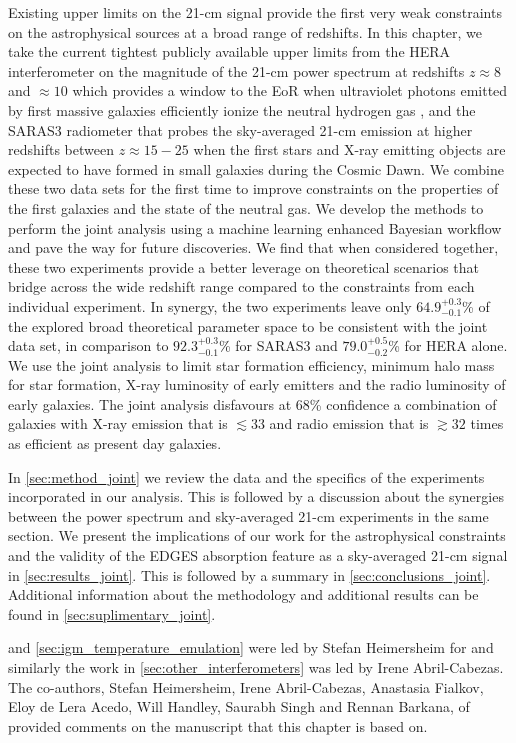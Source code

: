 Existing upper limits on the 21-cm signal provide the first very weak constraints on the astrophysical sources at a broad range of redshifts. 
In this chapter, we take the current tightest publicly available upper limits from the HERA interferometer on the magnitude of the 21-cm power spectrum at redshifts $z \approx 8$ and $\approx 10$  which provides a window to the EoR when ultraviolet photons emitted by first massive galaxies efficiently ionize the neutral hydrogen gas \cite{HERA_2022b}, and the SARAS3 radiometer \cite{SARAS3} that  probes the sky-averaged 21-cm emission at higher redshifts between $z\approx 15 - 25$ when the first stars and X-ray emitting objects are expected to have formed in small galaxies during the Cosmic Dawn. We combine these two data sets for the first time to improve constraints on the properties of the first galaxies and the state of the neutral gas. We develop the methods to perform the joint analysis using a machine learning enhanced Bayesian workflow and pave the way for future discoveries. We find that when considered together, these two experiments provide a better leverage on theoretical scenarios that bridge across the wide redshift range compared to the constraints from each individual experiment. In synergy, the two experiments leave  only $64.9^{+0.3}_{-0.1}$\% of the explored broad theoretical parameter space to be consistent with the joint data set, in comparison to $92.3^{+0.3}_{-0.1}$\% for SARAS3 and $79.0^{+0.5}_{-0.2}$\% for HERA alone. We use the joint analysis to limit  star formation efficiency, minimum halo mass for star formation, X-ray luminosity of early emitters and the radio luminosity of early galaxies. The joint analysis disfavours at 68\% confidence a combination of galaxies with X-ray emission that is $\lesssim 33$ and radio emission that is $\gtrsim 32$ times as efficient as present day galaxies.

In \cref{sec:method_joint} we review the data and the specifics of the experiments incorporated in our analysis. This is followed by a discussion about the synergies between the power spectrum and sky-averaged 21-cm experiments in the same section. We present the implications of our work for the astrophysical constraints and the validity of the EDGES absorption feature as a sky-averaged 21-cm signal in \cref{sec:results_joint}. This is followed by a summary in \cref{sec:conclusions_joint}. Additional information about the methodology and additional results can be found in \cref{sec:suplimentary_joint}.


 and \cref{sec:igm_temperature_emulation} were led by Stefan Heimersheim for \cite{Bevins_hera_saras3_2023} and similarly the work in \cref{sec:other_interferometers} was led by Irene Abril-Cabezas. The co-authors, Stefan Heimersheim, Irene Abril-Cabezas, Anastasia Fialkov, Eloy de Lera Acedo, Will Handley, Saurabh Singh and Rennan Barkana, of \cite{Bevins_hera_saras3_2023} provided comments on the manuscript that this chapter is based on.

